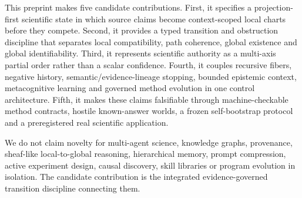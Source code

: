 \documentclass[11pt]{article}
\begin{document}
This preprint makes five candidate contributions. First, it specifies a projection-first scientific state in which source claims become context-scoped local charts before they compete. Second, it provides a typed transition and obstruction discipline that separates local compatibility, path coherence, global existence and global identifiability. Third, it represents scientific authority as a multi-axis partial order rather than a scalar confidence. Fourth, it couples recursive fibers, negative history, semantic/evidence-lineage stopping, bounded epistemic context, metacognitive learning and governed method evolution in one control architecture. Fifth, it makes these claims falsifiable through machine-checkable method contracts, hostile known-answer worlds, a frozen self-bootstrap protocol and a preregistered real scientific application.

We do not claim novelty for multi-agent science, knowledge graphs, provenance, sheaf-like local-to-global reasoning, hierarchical memory, prompt compression, active experiment design, causal discovery, skill libraries or program evolution in isolation. The candidate contribution is the integrated evidence-governed transition discipline connecting them.
\end{document}
